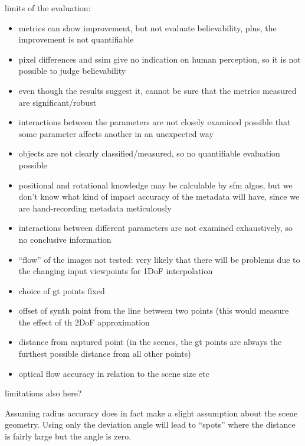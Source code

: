 limits of the evaluation:
\begin{itemize}
  \item metrics can show improvement, but not evaluate believability, plus, the improvement is not quantifiable
  \item pixel differences and ssim give no indication on human perception, so it is not possible to judge believability
  \item even though the results suggest it, cannot be sure that the metrics measured are significant/robust
  \item interactions between the parameters are not closely examined \ar possible that some parameter affects another in an unexpected way
  \item objects are not clearly classified/measured, so no quantifiable evaluation possible
  \item positional and rotational knowledge may be calculable by sfm algos, but we don't know what kind of impact accuracy of the metadata will have, since we are hand-recording metadata meticulously
  \item interactions between different parameters are not examined exhaustively, so no conclusive information
  \item ``flow'' of the images not tested: very likely that there will be problems due to the changing input viewpoints for 1DoF interpolation
\end{itemize}

\begin{itemize}
  \item choice of gt points \ar fixed
  \item \ar offset of synth point from the line between two points (this would measure the effect of th 2DoF approximation
  \item distance from captured point (in the scenes, the gt points are always the furthest possible distance from all other points)
  \item optical flow accuracy in relation to the scene size etc
\end{itemize}
limitations also here?

Assuming radius accuracy does in fact make a slight assumption about the scene geometry. Using only the deviation angle will lead to ``spots'' where the distance is fairly large but the angle is zero. 

